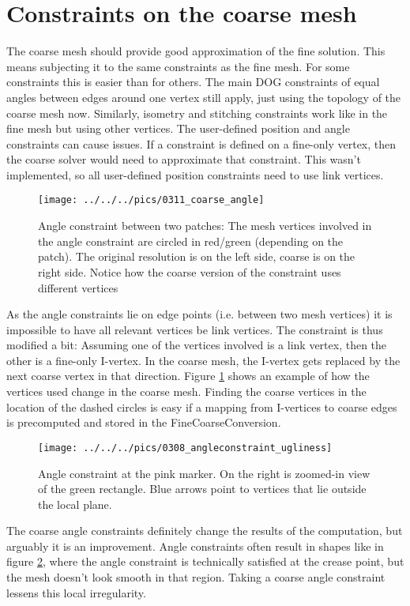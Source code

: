 \documentclass[a4paper,twoside,12pt,nochapterprefix]{scrbook}
\begin{document}
\section{Constraints on the coarse mesh}\label{sec:coarse_constraints}
The coarse mesh should provide good approximation of the fine solution. This means subjecting it to the same constraints as the fine mesh. For some constraints this is easier than for others.\newline
The main DOG constraints of equal angles between edges around one vertex still apply, just using the topology of the coarse mesh now. Similarly, isometry and stitching constraints work like in the fine mesh but using other vertices.\newline
The user-defined position and angle constraints can cause issues. If a constraint is defined on a fine-only vertex, then the coarse solver would need to approximate that constraint. This wasn't implemented, so all user-defined position constraints need to use link vertices.\newline
\begin{figure}
    \centering
    \texttt{[image: ../../../pics/0311\_coarse\_angle]}
    \caption{Angle constraint between two patches: The mesh vertices involved in the angle constraint are circled in red/green (depending on the patch). The original resolution is on the left side, coarse is on the right side. Notice how the coarse version of the constraint uses different vertices}
      \label{fig:angleconstraint_ftc}
\end{figure}
As the angle constraints lie on edge points (i.e. between two mesh vertices) it is impossible to have all relevant vertices be link vertices. The constraint is thus modified a bit: Assuming one of the vertices involved is a link vertex, then the other is a fine-only I-vertex. In the coarse mesh, the I-vertex gets replaced by the next coarse vertex in that direction. Figure \ref{fig:angleconstraint_ftc} shows an example of how the vertices used change in the coarse mesh. Finding the coarse vertices in the location of the dashed circles is easy if a mapping from I-vertices to coarse edges is precomputed and stored in the FineCoarseConversion.\newline
\begin{figure}
    \centering
    \texttt{[image: ../../../pics/0308\_angleconstraint\_ugliness]}
    \caption{Angle constraint at the pink marker. On the right is zoomed-in view of the green rectangle. Blue arrows point to vertices that lie outside the local plane.}
      \label{fig:angleconstraint_ugliness}
\end{figure}
The coarse angle constraints definitely change the results of the computation, but arguably it is an improvement. Angle constraints often result in shapes like in figure \ref{fig:angleconstraint_ugliness}, where the angle constraint is technically satisfied at the crease point, but the mesh doesn't look smooth in that region. Taking a coarse angle constraint lessens this local irregularity.\newline
\end{document}

